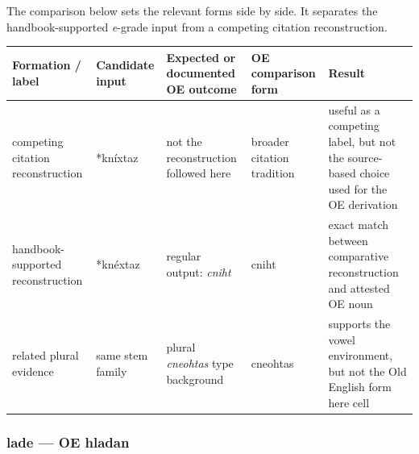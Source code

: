 \documentclass[
  british,
  a4paper,
]{article}
\newcounter{none} %
\begin{document}
The comparison below sets the relevant forms side by side. It separates
the handbook-supported \emph{e}-grade input from a competing citation
reconstruction.

{\def\LTcaptype{none} %
\begin{longtable}[]{@{}
  >{\raggedright\arraybackslash}p{}
  >{\raggedright\arraybackslash}p{}
  >{\raggedright\arraybackslash}p{}
  >{\raggedright\arraybackslash}p{}
  >{\raggedright\arraybackslash}p{}@{}}
\toprule\noalign{}
\begin{minipage}[b]{\linewidth}\raggedright
Formation / label
\end{minipage} & \begin{minipage}[b]{\linewidth}\raggedright
Candidate input
\end{minipage} & \begin{minipage}[b]{\linewidth}\raggedright
Expected or documented OE outcome
\end{minipage} & \begin{minipage}[b]{\linewidth}\raggedright
OE comparison form
\end{minipage} & \begin{minipage}[b]{\linewidth}\raggedright
Result
\end{minipage} \\
\midrule\noalign{}
\endhead
\bottomrule\noalign{}
\endlastfoot
competing citation reconstruction & *kníxtaz & not the reconstruction
followed here & broader citation tradition & useful as a competing
label, but not the source-based choice used for the OE derivation \\
handbook-supported reconstruction & *knéxtaz & regular output:
\emph{cniht} & cniht & exact match between comparative reconstruction
and attested OE noun \\
related plural evidence & same stem family & plural \emph{cneohtas} type
background & cneohtas & supports the vowel environment, but not the Old
English form here cell \\
\end{longtable}
}

\subsubsection{lade --- OE hladan}\label{lade-oe-hladan}
\end{document}
